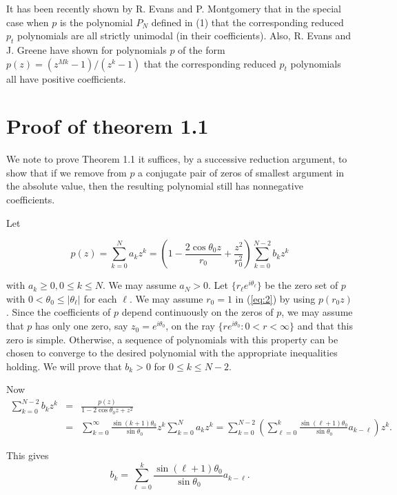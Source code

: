 It has been recently shown by R. Evans and P. Montgomery\cite{6} that in
the special case when $p$ is the polynomial $P_N$ defined in (1) that
the corresponding reduced $p_t$ polynomials are all strictly unimodal
(in their coefficients).  Also, R. Evans and J. Greene \cite{3} have
shown for polynomials $p$ of the form $p(z)=(z^{Mk}-1)/(z^k-1)$ that
the corresponding reduced $p_t$ polynomials all have positive coefficients.

\section{Proof of theorem 1.1}

We note to prove Theorem 1.1 it suffices, by a successive reduction
argument, to show that if we remove from $p$ a conjugate pair of
zeros of smallest argument in the absolute value, then the resulting
polynomial still has nonnegative coefficients.  



Let

\begin{equation} p(z) = \sum^N_{k=0} a_k z^k = (1 -\frac{2\cos
\theta_0 z}{r_0} + \frac{z^2}{r{_0^2}})\sum^{N-2}_{k=0} b_k
z^k\label{eq:2}\end{equation} 

\noindent with $a_k \geq 0, 0\leq k\leq N$.  We may assume $a_N > 0$.
Let $\{r_\ell e^{i\theta_\ell}\}$ be the zero set of $p$ with $0 <
\theta_0 \leq |\theta_\ell|$ for each $\ell$. We may assume $ r_0 =1$
 in (\ref{eq:2}) by using  $ p(r_{0}z)$. Since the coefficients of $p$ depend
continuously on the zeros of $p$, we may assume that $p$ has only one
zero, say $z_0 = e^{i \theta_0}$, on the ray $\{r e^{i\theta_0}: 0
< r < \infty\}$ and that this zero is simple.  Otherwise, a
sequence of polynomials with this property can be chosen to converge
to the desired polynomial with the appropriate inequalities holding.
 We will prove that $b_k > 0$ for $ 0 \leq k
 \leq {N-2}$. 

Now 
\begin{eqnarray*} \sum^{N-2}_{k=0} b_k z^k &=& \frac{p(z)}{1 -
2\cos \theta_0 z+ z^2}\\ &=& \sum^{\infty}_{k=0} \frac{\sin
(k+1)\theta_0}{\sin \theta_0} z^k \sum^N_{k=0} a_k z^k =
\sum^{N-2}_{k=0} \left(\sum^k_{\ell=0} \frac{\sin (\ell +1)
\theta_0}{\sin \theta_0} a_{k -\ell}\right) z^k.\end{eqnarray*} 

\noindent This gives \begin{equation} b_k = \sum^k_{\ell =0}
\frac{\sin (\ell +1)\theta_0}{\sin \theta_0} a_{k -
\ell}.\label{eq:3}\end{equation} 

